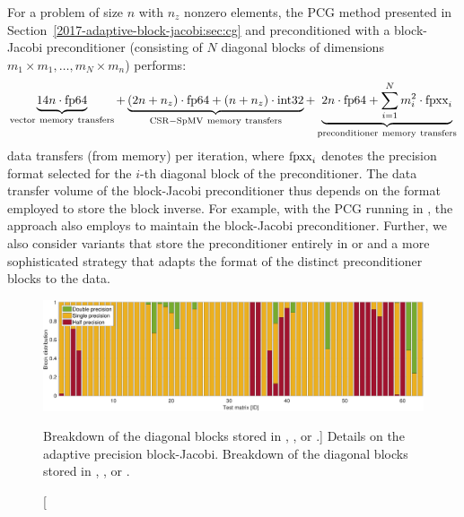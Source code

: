 For a problem of size $n$ with $n_z$ nonzero elements, the PCG method presented
in Section~\ref{2017-adaptive-block-jacobi:sec:cg} and preconditioned with a block-Jacobi preconditioner
(consisting of $N$ diagonal blocks of dimensions $m_1\times m_1,\ldots,m_N\times
m_n$) performs:
\begin{equation}
\label{2017-adaptive-block-jacobi:eqn:cost}
\underbrace{14 n \cdot \fpd}_\mathrm{vector\ memory\ transfers} + 
\underbrace{(2 n + n_z) \cdot \fpd + (n+n_z)\cdot \inti}_\mathrm{CSR-SpMV\ 
memory\ transfers} +
\underbrace{2 n \cdot \fpd +
\sum_{i=1}^{N} m_i^2 \cdot \fpv_i
}_\mathrm{preconditioner\ memory\ transfers}
\end{equation}
data transfers (from memory) per iteration, where $\mbox{\rm fpxx}_i$ denotes the precision
format selected for the $i$-th diagonal block of the preconditioner. The data
transfer volume of the block-Jacobi preconditioner thus depends on the format
employed to store the block inverse. For example, with the PCG running in \fpd, 
the approach also employs \fpd to maintain the
block-Jacobi preconditioner. Further, we also consider variants that store
the preconditioner entirely in \fps or \fph and a more sophisticated
strategy that adapts the format of the distinct preconditioner blocks to the
data.

\begin{figure}[t]
\begin{center}
\includegraphics[width=\textwidth]{plots/blockinfo_adapt}
\caption
[Breakdown of the diagonal blocks stored in \fpd, \fps, or \fph.]
{Details on the adaptive precision block-Jacobi. Breakdown of the 
diagonal blocks stored in \fpd, \fps, or \fph.}
\label{2017-adaptive-block-jacobi:fig:blockinfo}
\end{center}
\end{figure}

